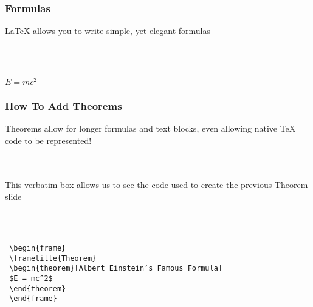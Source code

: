 \documentclass{beamer}
\begin{document}

\begin{frame}
\frametitle{Formulas}

LaTeX allows you to write simple, yet elegant formulas

\\~\\

\begin{theorem}
$E = mc^2$
\end{theorem}

\end{frame}


\begin{frame}[fragile]
\frametitle{How To Add Theorems}

Theorems allow for longer formulas and text blocks, even allowing native TeX code to be represented!

\\~\\

This verbatim box allows us to see the code used to create the previous Theorem slide

\\~\\

\begin{example}
\begin{verbatim}
 \begin{frame}
 \frametitle{Theorem}
 \begin{theorem}[Albert Einstein’s Famous Formula]
 $E = mc^2$
 \end{theorem}
 \end{frame}\end{verbatim}
\end{example}

\end{frame}

\end{document}

